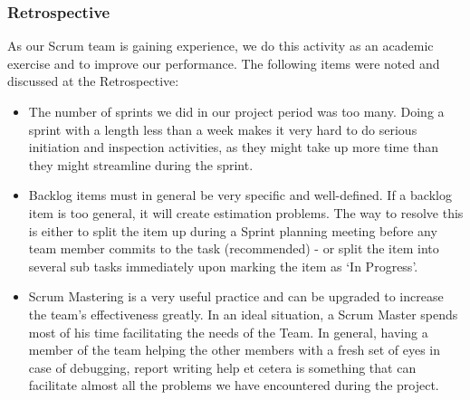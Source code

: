 \subsubsection{Retrospective}
As our Scrum team is gaining experience, we do this activity as an academic exercise and to improve our performance. The following items were noted and discussed at the Retrospective:
\begin{itemize}
\item The number of sprints we did in our project period was too many. Doing a sprint with a length less than a week makes it very hard to do serious initiation and inspection activities, as they might take up more time than they might streamline during the sprint.
\item Backlog items must in general be very specific and well-defined. If a backlog item is too general, it will create estimation problems. The way to resolve this is either to split the item up during a Sprint planning meeting before any team member commits to the task (recommended) - or split the item into several sub tasks immediately upon marking the item as `In Progress'.
\item Scrum Mastering is a very useful practice and can be upgraded to increase the team's effectiveness greatly. In an ideal situation, a Scrum Master spends most of his time facilitating the needs of the Team. In general, having a member of the team helping the other members with a fresh set of eyes in case of debugging, report writing help et cetera is something that can facilitate almost all the problems we have encountered during the project.
\end{itemize}
\newpage